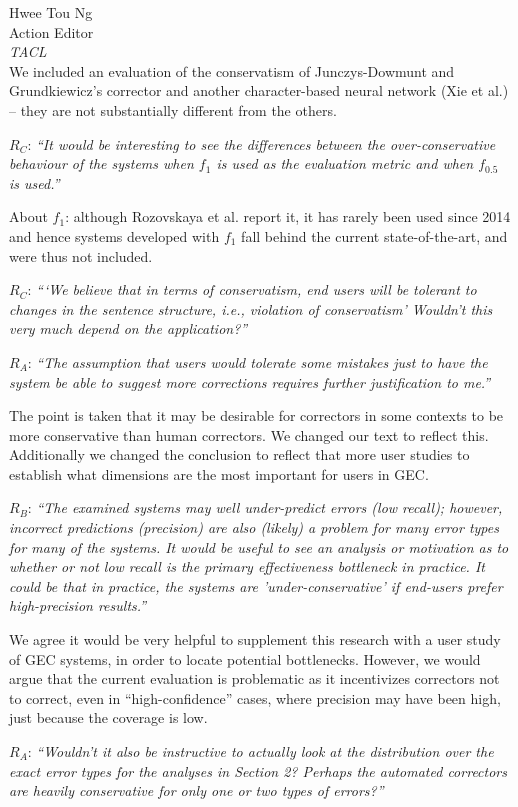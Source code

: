 \documentclass[11pt,letterpaper]{letter}
\begin{document}
\begin{letter}{%
Hwee Tou Ng\\
Action Editor\\
{\em TACL}\\
}
We included an evaluation of the conservatism of Junczys-Dowmunt and Grundkiewicz's corrector  and another character-based neural network (Xie et al.) -- they are not substantially different from the others.

$R_C$: \emph{``It would be interesting to see the differences between the over-conservative
	behaviour of the systems when $f_1$ is used as the evaluation metric and when
	$f_{0.5}$ is used.''}

About $f_1$: although Rozovskaya et al. report it, it has rarely been used since 2014 and hence systems developed with $f_1$ fall behind the current state-of-the-art, and were thus not included.
	
$R_C$: \emph{```We believe that in terms of conservatism, end users will be tolerant to
	changes in the sentence structure, i.e., violation of conservatism' Wouldn't
	this very much depend on the application?''
}

$R_A$: \emph{``The assumption that users would tolerate
	some mistakes just to have the system be able to suggest more corrections
	requires further justification to me.''
}
	
The point is taken that it may be desirable for correctors in some contexts to be more conservative than human correctors. We changed our text to reflect this. Additionally we changed the conclusion to reflect that more user studies to establish what dimensions are the most important for users in GEC.

$R_B$: \emph{``The examined systems may well under-predict errors (low recall); however,
	incorrect predictions (precision) are also (likely) a problem for many error
	types for many of the systems. It would be useful to see an analysis or
	motivation as to whether or not low recall is the primary effectiveness
	bottleneck in practice. It could be that in practice, the systems are
	'under-conservative' if end-users prefer high-precision results.''
	}

We agree it would be very helpful to supplement this research with a user study of GEC systems, in order to locate potential bottlenecks. However, we would argue that the current evaluation is problematic as it incentivizes correctors not to correct, even in ``high-confidence'' cases, where precision may have been high, just because the coverage is low. 

$R_A$: \emph{``Wouldn't it also be instructive to actually look at the distribution
	over the exact error types for the analyses in Section 2? Perhaps the automated correctors are heavily conservative for only one or two types of errors?''
	}
	

\end{letter}
\end{document}
